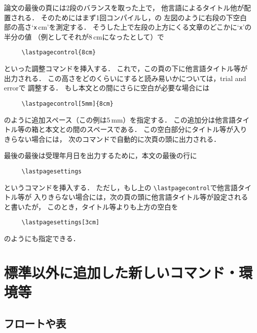 \documentclass[dvipdfmx,onecolumn]{jsce}  %
\begin{document}
論文の最後の頁には2段のバランスを取った上で，
他言語によるタイトル他が配置される．
そのためにはまず1回コンパイルし，\figno{\ref{fig:layout}}の
左図のように右段の下空白部の高さ`{\tt x}\,cm'を測定する．
そうした上で左段の上方にくる文章のどこかに`{\tt x}'の半分の値
（例としてそれが8\,cmになったとして）で
\begin{verbatim}
     \lastpagecontrol{8cm}
\end{verbatim}
といった調整コマンドを挿入する．
これで，この頁の下に他言語タイトル等が出力される．
この高さをどのくらいにすると読み易いかについては，trial and errorで
調整する．
もし本文との間にさらに空白が必要な場合には
\begin{verbatim}
     \lastpagecontrol[5mm]{8cm}
\end{verbatim}
のように追加スペース（この例は5\,mm）を指定する．
この追加分は他言語タイトル等の箱と本文との間のスペースである．
この空白部分にタイトル等が入りきらない場合には，
次のコマンドで自動的に次頁の頭に出力される．

最後の最後は受理年月日を出力するために，本文の最後の行に
\begin{verbatim}
     \lastpagesettings
\end{verbatim}
というコマンドを挿入する．
ただし，もし上の \verb+\lastpagecontrol+で他言語タイトル等が
入りきらない場合には，次の頁の頭に他言語タイトル等が設定されると書いたが，
このとき，タイトル等よりも上方の空白を
\begin{verbatim}
     \lastpagesettings[3cm]
\end{verbatim}
のようにも指定できる．




\section{標準以外に追加した新しいコマンド・環境等}

\subsection{フロートや表}
\end{document}
